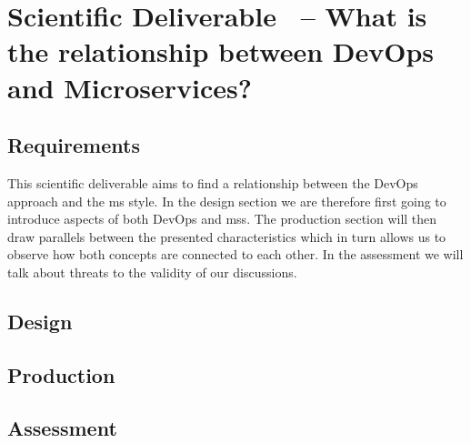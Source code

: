 \section{Scientific Deliverable \thesdel\ -- What is the relationship
between DevOps and Microservices?}

\subsection{Requirements}

This scientific deliverable aims to find a relationship between the
DevOps approach and the \gls{ms} style. In the design section we are
therefore first going to introduce aspects of both DevOps and
\glspl{ms}. The production section will then draw parallels between
the presented characteristics which in turn allows us to observe how
both concepts are connected to each other. In the assessment we will
talk about threats to the validity of our discussions.

\subsection{Design}


\subsection{Production}


\subsection{Assessment}

